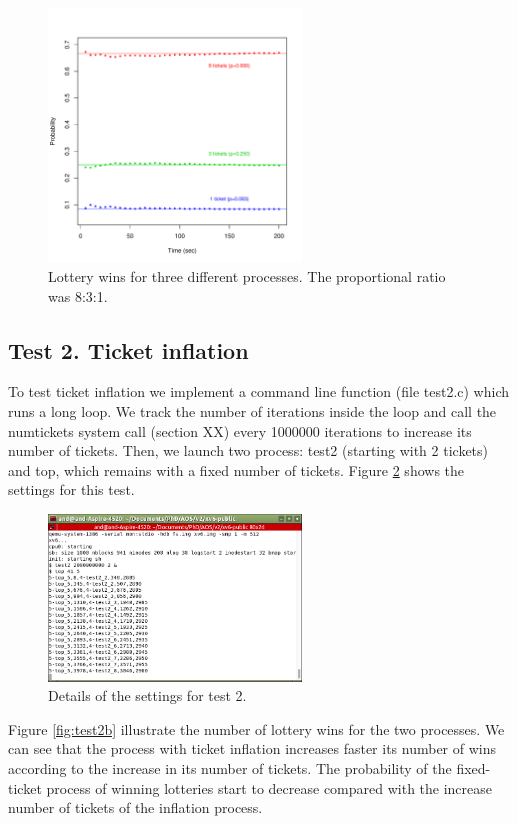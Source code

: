 \documentclass[10pt]{scrartcl}
\begin{document}
\begin{figure}
  \centering
  \includegraphics[width=0.6\textwidth]{test1b}
  \caption{Lottery wins for three different processes. The proportional ratio was 8:3:1.}\label{fig:test1b}
\end{figure}

\subsection{Test 2. Ticket inflation}
To test ticket inflation we implement a command line function (file test2.c) which runs a long loop.  We track the number of iterations inside the loop and call the numtickets system call (section XX) every 1000000 iterations to increase its number of tickets. Then, we launch two process: test2 (starting with 2 tickets) and top, which remains with a fixed number of tickets.  Figure \ref{fig:test2a} shows the settings for this test.  

\begin{figure}
  \centering
  \includegraphics[width=0.6\textwidth]{test2c.png}
  \caption{Details of the settings for test 2.}\label{fig:test2a}
\end{figure}

Figure \ref{fig:test2b} illustrate the number of lottery wins for the two processes.  We can see that the process with ticket inflation increases faster its number of wins according to the increase in its number of tickets.  The probability of the fixed-ticket process of winning lotteries start to decrease compared with the increase number of tickets of the inflation process.
\end{document}
